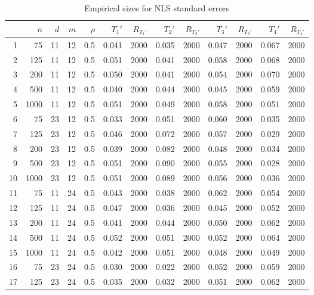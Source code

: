 \documentclass{article}
\begin{document}
\begin{table}[ht]
\begin{center}
\caption{Empirical sizes for NLS standard errors}
\label{tab:sizenls}
\begin{tabular}{rrrrrrrrrrrrr}
  \hline
 & $n$ & $d$ & $m$ & $\rho$ & $T_1'$ & $R_{T_1'}$ & $T_2'$ & $R_{T_2'}$ & $T_3'$ & $R_{T_3'}$ & $T_4'$ & $R_{T_4'}$ \\ 
  \hline
1 & 75 & 11 & 12 & 0.5 & 0.041 & 2000 & 0.035 & 2000 & 0.047 & 2000 & 0.067 & 2000 \\ 
  2 & 125 & 11 & 12 & 0.5 & 0.051 & 2000 & 0.041 & 2000 & 0.058 & 2000 & 0.068 & 2000 \\ 
  3 & 200 & 11 & 12 & 0.5 & 0.050 & 2000 & 0.041 & 2000 & 0.054 & 2000 & 0.070 & 2000 \\ 
  4 & 500 & 11 & 12 & 0.5 & 0.040 & 2000 & 0.044 & 2000 & 0.045 & 2000 & 0.059 & 2000 \\ 
  5 & 1000 & 11 & 12 & 0.5 & 0.051 & 2000 & 0.049 & 2000 & 0.058 & 2000 & 0.051 & 2000 \\ 
   \hline
6 & 75 & 23 & 12 & 0.5 & 0.033 & 2000 & 0.051 & 2000 & 0.060 & 2000 & 0.035 & 2000 \\ 
  7 & 125 & 23 & 12 & 0.5 & 0.046 & 2000 & 0.072 & 2000 & 0.057 & 2000 & 0.029 & 2000 \\ 
  8 & 200 & 23 & 12 & 0.5 & 0.039 & 2000 & 0.082 & 2000 & 0.048 & 2000 & 0.034 & 2000 \\ 
  9 & 500 & 23 & 12 & 0.5 & 0.051 & 2000 & 0.090 & 2000 & 0.055 & 2000 & 0.028 & 2000 \\ 
  10 & 1000 & 23 & 12 & 0.5 & 0.051 & 2000 & 0.089 & 2000 & 0.056 & 2000 & 0.036 & 2000 \\ 
   \hline
11 & 75 & 11 & 24 & 0.5 & 0.043 & 2000 & 0.038 & 2000 & 0.062 & 2000 & 0.054 & 2000 \\ 
  12 & 125 & 11 & 24 & 0.5 & 0.047 & 2000 & 0.036 & 2000 & 0.045 & 2000 & 0.052 & 2000 \\ 
  13 & 200 & 11 & 24 & 0.5 & 0.041 & 2000 & 0.044 & 2000 & 0.050 & 2000 & 0.062 & 2000 \\ 
  14 & 500 & 11 & 24 & 0.5 & 0.052 & 2000 & 0.051 & 2000 & 0.052 & 2000 & 0.064 & 2000 \\ 
  15 & 1000 & 11 & 24 & 0.5 & 0.042 & 2000 & 0.051 & 2000 & 0.048 & 2000 & 0.049 & 2000 \\ 
   \hline
16 & 75 & 23 & 24 & 0.5 & 0.030 & 2000 & 0.022 & 2000 & 0.052 & 2000 & 0.059 & 2000 \\ 
  17 & 125 & 23 & 24 & 0.5 & 0.035 & 2000 & 0.032 & 2000 & 0.051 & 2000 & 0.062 & 2000 \\ 

\end{tabular}
\end{center}
\end{table}
\end{document}
